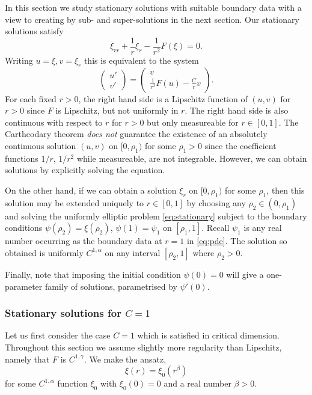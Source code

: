 \documentclass{amsart}
\begin{document}
In this section we study stationary solutions with suitable boundary data with a view to creating by sub- and super-solutions in the next section. Our stationary solutions satisfy
\begin{equation}
\label{eq:stationary}
\xi_{rr} + \frac{1}{r} \xi_r - \frac{1}{r^2} F(\xi)  = 0.
\end{equation}
Writing \(u = \xi, v = \xi_r\) this is equivalent to the system
\[
\begin{pmatrix}
u' \\
v'
\end{pmatrix}
=
\begin{pmatrix}
v \\
\frac{1}{r^2} F(u) - \frac{C}{r} v
\end{pmatrix}.
\]
For each fixed \(r > 0\), the right hand side is a Lipschitz function of \((u,v)\) for \(r>0\) since \(F\) is Lipschitz, but not uniformly in \(r\). The right hand side is also continuous with respect to \(r\) for \(r > 0\) but only measureable for \(r \in [0, 1]\). The Cartheodary theorem \emph{does not} guarantee the existence of an absolutely continuous solution \((u, v)\) on \([0, \rho_1)\) for some  \(\rho_1 > 0\) since the coefficient functions \(1/r\), \(1/r^2\) while measureable, are not integrable. However, we can obtain solutions by explicitly solving the equation.

On the other hand, if we can obtain a solution \(\xi_r\) on \([0,\rho_1)\) for some \(\rho_1\), then this solution may be extended uniquely to \(r \in [0, 1]\) by choosing any \(\rho_2 \in (0, \rho_1)\) and solving the uniformly elliptic problem \eqref{eq:stationary} subject to the boundary conditions \(\psi(\rho_2) = \xi(\rho_2)\), \(\psi(1) = \psi_1\) on \([\rho_1, 1]\). Recall \(\psi_1\) is any real number occurring as the boundary data at \(r=1\) in \eqref{eq:pde}. The solution so obtained is uniformly \(C^{1,\alpha}\) on any interval \([\rho_2, 1]\) where \(\rho_2 > 0\).

Finally, note that imposing the initial condition \(\psi(0) = 0\) will give a one-parameter family of solutions, parametrised by \(\psi'(0)\).

\subsubsection*{Stationary solutions for \(C=1\)}

Let us first consider the case \(C = 1\) which is satisfied in critical dimension. Throughout this section we assume slightly more regularity than Lipschitz, namely that \(F\) is \(C^{1,\gamma}\). We make the ansatz,
\[
\xi(r) = \xi_0(r^{\beta})
\]
for some \(C^{1,\alpha}\) function \(\xi_0\) with \(\xi_0(0) = 0\) and a real number \(\beta > 0\).
\end{document}
